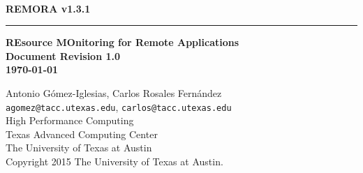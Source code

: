 \documentclass[10pt,a4paper]{report}
\begin{document}
\begin{titlepage}
\thispagestyle{empty}	%
\verb+ +
\vspace{1em}
\begin{flushright}
\huge\bf REMORA v1.3.1\\
\rule{\textwidth}{4pt}
\large{\bf REsource MOnitoring for Remote Applications\\
Document Revision 1.0\\
\today}
\end{flushright}

\newpage
\thispagestyle{empty}
\begin{flushleft}
Antonio G\'omez-Iglesias, Carlos Rosales Fern\'andez \\
\verb+agomez@tacc.utexas.edu+, \verb+carlos@tacc.utexas.edu+\\
\vspace{0.5em}
High Performance Computing \\
Texas Advanced Computing Center\\
The University of Texas at Austin\\
\vspace{1cm}
Copyright 2015 The University of Texas at Austin.
\end{flushleft}
\newpage
\end{titlepage}
\end{document}
